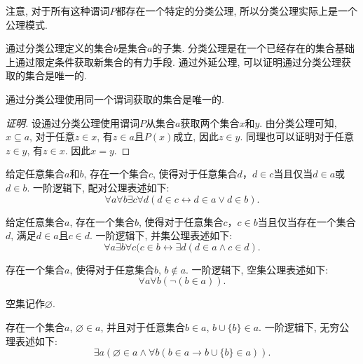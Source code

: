 注意, 对于所有这种谓词$P$都存在一个特定的分类公理, 所以分类公理实际上是一个公理模式.

通过分类公理定义的集合$b$是集合$a$的子集. 分类公理是在一个已经存在的集合基础上通过限定条件获取新集合的有力手段. 通过外延公理, 可以证明通过分类公理获取的集合是唯一的.

\begin{proposition}
	通过分类公理使用同一个谓词获取的集合是唯一的.
\end{proposition}

\begin{proof}[证明]
	设通过分类公理使用谓词$P$从集合$a$获取两个集合$x$和$y$. 由分类公理可知, $x\subseteq a$, 对于任意$z \in x$, 有$z\in a$且$P(x)$成立, 因此$z\in y$. 同理也可以证明对于任意$z \in y$, 有$z \in x$. 因此$x=y$.
\end{proof}

\begin{axiom}[配对公理]
	给定任意集合$a$和$b$, 存在一个集合$c$, 使得对于任意集合$d$，$d\in c$当且仅当$d\in a$或$d\in b$. 一阶逻辑下, 配对公理表述如下:
	\begin{equation}
		\forall a\forall b\exists c\forall d(d\in c\leftrightarrow d\in a\vee d\in b).
	\end{equation}
\end{axiom}

\begin{axiom}[并集公理]
	给定任意集合$a$, 存在一个集合$b$, 使得对于任意集合$c$，$c\in b$当且仅当存在一个集合$d$, 满足$d\in  a$且$c\in d$. 一阶逻辑下, 并集公理表述如下:
	\begin{equation}
		\forall a\exists b\forall c(c\in b\leftrightarrow \exists d(d\in a \wedge c\in d).
	\end{equation}
\end{axiom}

\begin{axiom}[空集公理]
	存在一个集合$a$, 使得对于任意集合$b$, $b\notin a$. 一阶逻辑下, 空集公理表述如下:
	\begin{equation}
		\forall a\forall b(\neg(b\in a)).
	\end{equation}

	空集记作$\varnothing$.
\end{axiom}

\begin{axiom}[无穷公理]
	存在一个集合$a$, $\varnothing \in a$, 并且对于任意集合$b\in a$, $b\cup \{b\}\in a$. 一阶逻辑下, 无穷公理表述如下:
	\begin{equation}
		\exists a(\varnothing \in a \wedge \forall b(b\in a \rightarrow b\cup\{b\}\in a)).
	\end{equation}
\end{axiom}

